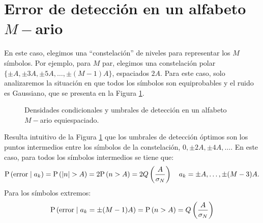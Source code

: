 \section{Error de detección en un alfabeto $M-$ario}

En este caso, elegimos una ``constelación'' de niveles para representar los $M$ símbolos. Por ejemplo, para $M$ par, elegimos una constelación polar $\{\pm A, \pm 3A,\pm 5A,\ldots,\pm (M-1)A\}$, espaciados $2A$. Para este caso, solo analizaremos la situación en que todos los símbolos son equiprobables y el ruido es Gaussiano, que se presenta en la Figura \ref{fig:ruido m-ario}.

\begin{figure}
    \begin{center}
    \end{center}
    \caption{Densidades condicionales y umbrales de detección en un alfabeto $M-$ario equiespaciado.}\label{fig:ruido m-ario}
\end{figure}

Resulta intuitivo de la Figura \ref{fig:ruido m-ario} que los umbrales de detección óptimos son los puntos intermedios entre los símbolos de la constelación, $0,\pm 2A, \pm 4A,\ldots$. En este caso, para todos los símbolos intermedios se tiene que:
\begin{equation*}
    \p{\text{error} \mid a_k} = \p{|n|>A} = 2\p{n>A} = 2Q\left(\frac{A}{\sigma_N}\right) \quad a_k=\pm A,\ldots, \pm(M-3)A.
\end{equation*}
Para los símbolos extremos:
\begin{equation*}
    \mathrm{P}\left(\text{error} \mid a_k=\pm (M-1)A\right) = \mathrm{P}\left(n>A\right) = Q\left(\frac{A}{\sigma_N}\right)
\end{equation*}

